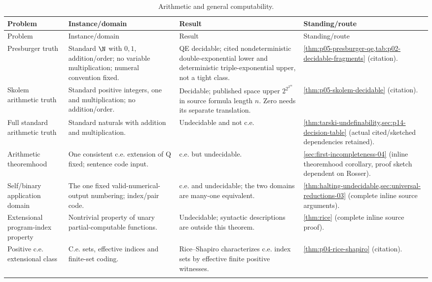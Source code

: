 \begin{landscape}
\begingroup\small\setlength{\tabcolsep}{3pt}
\begin{longtable}{@{}p{.18\linewidth}p{.25\linewidth}p{.23\linewidth}p{.26\linewidth}@{}}
\caption{Arithmetic and general computability.}\label{tab:p14-dc-arithmetic}\\
\toprule
Problem & Instance/domain & Result & Standing/route\\\midrule
\endfirsthead
\toprule
Problem & Instance/domain & Result & Standing/route\\\midrule
\endhead
\bottomrule\endfoot
Presburger truth & Standard \(\N\) with \(0,1\), addition/order; no variable multiplication; numeral convention fixed. & QE decidable; cited nondeterministic double-exponential lower and deterministic triple-exponential upper, not a tight class. & \cref{thm:p05-presburger-qe,tab:p02-decidable-fragments} (citation).\\\addlinespace
Skolem arithmetic truth & Standard positive integers, one and multiplication; no addition/order. & Decidable; published space upper \(2^{2^{2^{cn}}}\) in source formula length \(n\). Zero needs its separate translation. & \cref{thm:p05-skolem-decidable} (citation).\\\addlinespace
Full standard arithmetic truth & Standard naturals with addition and multiplication. & Undecidable and not c.e. & \cref{thm:tarski-undefinability,sec:p14-decision-table} (actual cited/sketched dependencies retained).\\\addlinespace
Arithmetic theoremhood & One consistent c.e. extension of Q fixed; sentence code input. & c.e. but undecidable. & \cref{sec:first-incompleteness-04} (inline theoremhood corollary, proof sketch dependent on Rosser).\\\addlinespace
Self/binary application domain & The one fixed valid-numerical-output numbering; index/pair code. & c.e. and undecidable; the two domains are many-one equivalent. & \cref{thm:halting-undecidable,sec:universal-reductions-03} (complete inline source arguments).\\\addlinespace
Extensional program-index property & Nontrivial property of unary partial-computable functions. & Undecidable; syntactic descriptions are outside this theorem. & \cref{thm:rice} (complete inline source proof).\\\addlinespace
Positive c.e. extensional class & C.e. sets, effective indices and finite-set coding. & Rice--Shapiro characterizes c.e. index sets by effective finite positive witnesses. & \cref{thm:p04-rice-shapiro} (citation).\\\addlinespace

\end{longtable}
\end{landscape}
